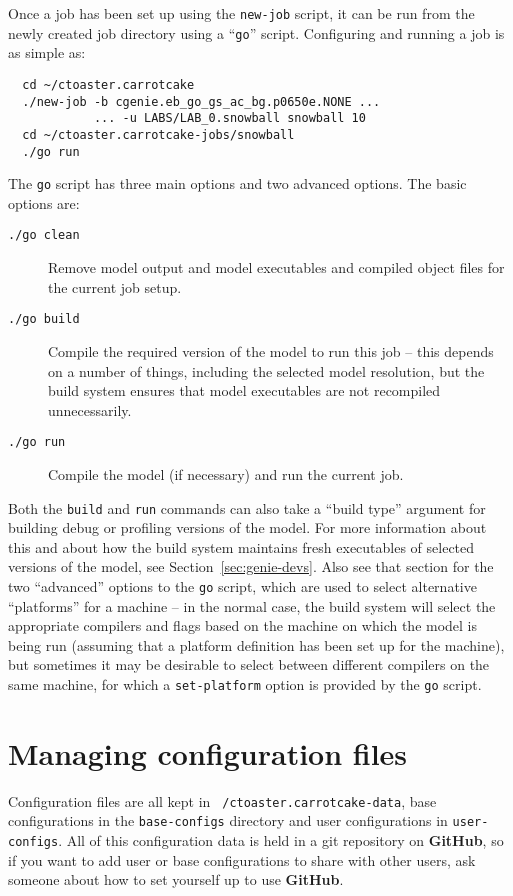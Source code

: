\documentclass[a4paper,10pt,article]{memoir}
\begin{document}
Once a job has been set up using the \texttt{new-job} script, it can
be run from the newly created job directory using a ``\texttt{go}''
script.  Configuring and running a job is as simple as:
\begin{verbatim}
  cd ~/ctoaster.carrotcake
  ./new-job -b cgenie.eb_go_gs_ac_bg.p0650e.NONE ...
            ... -u LABS/LAB_0.snowball snowball 10
  cd ~/ctoaster.carrotcake-jobs/snowball
  ./go run
\end{verbatim}
The \texttt{go} script has three main options and two advanced
options.  The basic options are:
\begin{description}
  \item[\texttt{./go clean}]{Remove model output and model executables
    and compiled object files for the current job setup.}
  \item[\texttt{./go build}]{Compile the required version of the model
    to run this job -- this depends on a number of things, including
    the selected model resolution, but the build system ensures that
    model executables are not recompiled unnecessarily.}
  \item[\texttt{./go run}]{Compile the model (if necessary) and run
    the current job.}
\end{description}
Both the \texttt{build} and \texttt{run} commands can also take a
``build type'' argument for building debug or profiling versions of
the model.  For more information about this and about how the build
system maintains fresh executables of selected versions of the model,
see Section~\ref{sec:genie-devs}.  Also see that section for the two
``advanced'' options to the \texttt{go} script, which are used to
select alternative ``platforms'' for a machine -- in the normal case,
the build system will select the appropriate compilers and flags based
on the machine on which the model is being run (assuming that a
platform definition has been set up for the machine), but sometimes it
may be desirable to select between different compilers on the same
machine, for which a \texttt{set-platform} option is provided by the
\texttt{go} script.

\section{Managing configuration files}

Configuration files are all kept in \texttt{~/ctoaster.carrotcake-data}, base
configurations in the \texttt{base-configs} directory and user
configurations in \texttt{user-configs}.  All of this configuration
data is held in a git repository on \textbf{GitHub}, so if you want to add user
or base configurations to share with other users, ask someone about
how to set yourself up to use \textbf{GitHub}.
\end{document}

